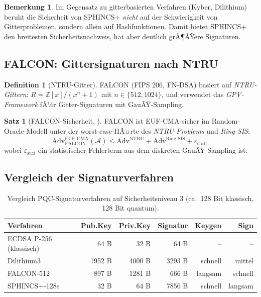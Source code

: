 ﻿\documentclass[a4paper,12pt]{article}
\theoremstyle{definition}
\newtheorem{definition}{Definition}[section]
\newtheorem{bemerkung}{Bemerkung}[section]
\newtheorem{satz}{Satz}[section]
\begin{document}
\begin{bemerkung}
Im Gegensatz zu gitterbasierten Verfahren (Kyber, Dilithium) beruht die
Sicherheit von SPHINCS+ \emph{nicht} auf der Schwierigkeit von Gitterproblemen,
sondern allein auf Hashfunktionen. Damit bietet SPHINCS+ den breitesten
Sicherheitsnachweis, hat aber deutlich grÃ¶ÃŸere Signaturen.
\end{bemerkung}

\subsection{FALCON: Gittersignaturen nach NTRU}

\begin{definition}[NTRU-Gitter]
FALCON \cite{PFH+22} (FIPS 206, FN-DSA) basiert auf \emph{NTRU-Gittern}:
$R = \mathbb{Z}[x]/(x^n+1)$ mit $n \in \{512, 1024\}$,
und verwendet das \emph{GPV-Framework} \cite{GPV08} fÃ¼r Gitter-Signaturen
mit GauÃŸ-Sampling.
\end{definition}

\begin{satz}[FALCON-Sicherheit, \cite{PFH+22}]
FALCON ist EUF-CMA-sicher im Random-Oracle-Modell unter der worst-case-HÃ¤rte
des \emph{NTRU-Problems} und \emph{Ring-SIS}:
\[
  \mathrm{Adv}^{\mathrm{EUF\text{-}CMA}}_{\mathrm{FALCON}}(\mathcal{A})
  \leq \mathrm{Adv}^{\mathrm{NTRU}} + \mathrm{Adv}^{\mathrm{Ring\text{-}SIS}} + \varepsilon_\mathrm{stat},
\]
wobei $\varepsilon_\mathrm{stat}$ ein statistischer Fehlerterm aus dem
diskreten GauÃŸ-Sampling ist.
\end{satz}

\subsection{Vergleich der Signaturverfahren}

\begin{table}[H]
\centering
\caption{Vergleich PQC-Signaturverfahren auf Sicherheitsniveau 3 (ca.\ 128 Bit klassisch, 128 Bit quantum).}
\label{tab:sigcomp}
\begin{tabular}{lrrrrr}
\toprule
Verfahren & Pub.Key & Priv.Key & Signatur & Keygen & Sign\\
\midrule
ECDSA P-256 (klassisch)  & 64 B   & 32 B   & 64 B    & -- & --\\
\midrule
Dilithium3   & 1952 B  & 4000 B  & 3293 B  & schnell & mittel\\
FALCON-512   & 897 B   & 1281 B  & 666 B   & langsam & schnell\\
SPHINCS+-128s & 32 B   & 64 B    & 7856 B  & schnell & langsam\\
\bottomrule
\end{tabular}
\end{table}
\end{document}
